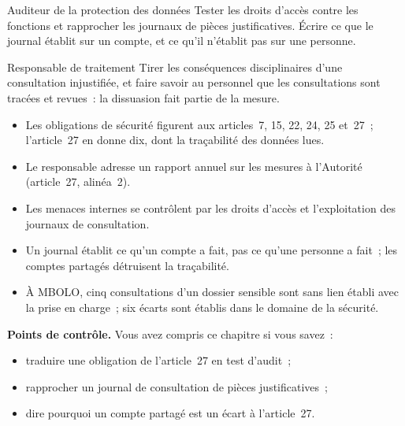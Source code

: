 \begin{boxmetier}{Auditeur de la protection des données}
Tester les droits d'accès contre les fonctions et rapprocher les journaux de
pièces justificatives. Écrire ce que le journal établit sur un compte, et ce
qu'il n'établit pas sur une personne.
\end{boxmetier}

\begin{boxmetier}{Responsable de traitement}
Tirer les conséquences disciplinaires d'une consultation injustifiée, et
faire savoir au personnel que les consultations sont tracées et revues~:
la dissuasion fait partie de la mesure.
\end{boxmetier}

\begin{boxresume}
\begin{itemize}
    \item Les obligations de sécurité figurent aux articles~7, 15, 22, 24,
          25 et~27~; l'article~27 en donne dix, dont la traçabilité des
          données lues.
    \item Le responsable adresse un rapport annuel sur les mesures à
          l'Autorité (article~27, alinéa~2).
    \item Les menaces internes se contrôlent par les droits d'accès et
          l'exploitation des journaux de consultation.
    \item Un journal établit ce qu'un compte a fait, pas ce qu'une personne a
          fait~; les comptes partagés détruisent la traçabilité.
    \item À MBOLO, cinq consultations d'un dossier sensible sont sans lien
          établi avec la prise en charge~; six écarts sont établis dans le
          domaine de la sécurité.
\end{itemize}
\end{boxresume}

\begin{boxinfo}
\textbf{Points de contrôle.} Vous avez compris ce chapitre si vous savez~:
\begin{itemize}
    \item traduire une obligation de l'article~27 en test d'audit~;
    \item rapprocher un journal de consultation de pièces justificatives~;
    \item dire pourquoi un compte partagé est un écart à l'article~27.
\end{itemize}
\end{boxinfo}


